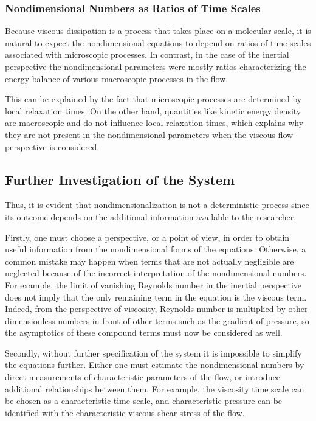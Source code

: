 \subsubsection{Nondimensional Numbers as Ratios of Time Scales}

Because viscous dissipation is a process that takes place on a molecular scale, it is natural to expect the nondimensional equations to depend on ratios of time scales associated with microscopic processes. In contrast, in the case of the inertial perspective the nondimensional parameters were mostly ratios characterizing the energy balance of various macroscopic processes in the flow. 

This can be explained by the fact that microscopic processes are determined by local relaxation times. On the other hand, quantities like kinetic energy density are macroscopic and do not influence local relaxation times, which explains why they are not present in the nondimensional parameters when the viscous flow perspective is considered.

\subsection{Further Investigation of the System}

Thus, it is evident that nondimensionalization is not a deterministic process since its outcome depends on the additional information available to the researcher. 

Firstly, one must choose a perspective, or a point of view, in order to obtain useful information from the nondimensional forms of the equations. Otherwise, a common mistake may happen when terms that are not actually negligible are neglected because of the incorrect interpretation of the nondimensional numbers. For example, the limit of vanishing Reynolds number in the inertial perspective does not imply that the only remaining term in the equation is the viscous term. Indeed, from the perspective of viscosity, Reynolds number is multiplied by other dimensionless numbers in front of other terms such as the gradient of pressure, so the asymptotics of these compound terms must now be considered as well. 

Secondly, without further specification of the system it is impossible to simplify the equations further. Either one must estimate the nondimensional numbers by direct measurements of characteristic parameters of the flow, or introduce additional relationships between them. For example, the viscosity time scale can be chosen as a characteristic time scale, and characteristic pressure can be identified with the characteristic viscous shear stress of the flow.
